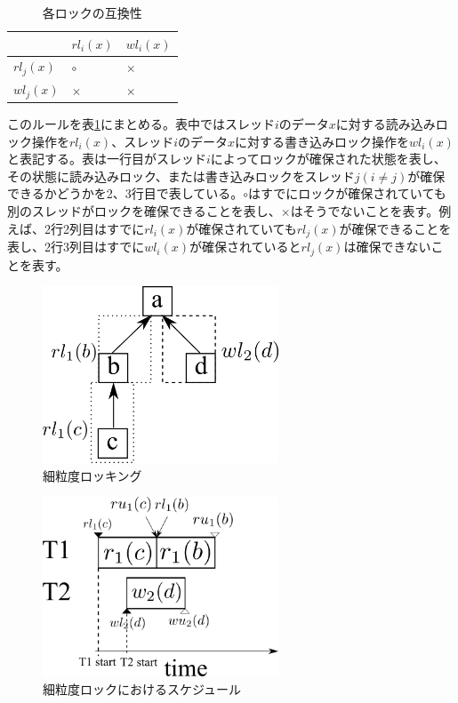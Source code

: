 \documentclass[a4paper]{jreport}	%
\begin{document}
\begin{table}[h!]
\centering
\begin{tabular}{ | m{1cm} | m{1cm} | m{1cm} | } 
  \hline
  & $rl_i(x)$ & $wl_i(x)$ \\ 
  \hline
  $rl_j(x)$ & $\circ$ & $\times$ \\ 
  \hline
  $wl_j(x)$ &  $\times$ & $\times$ \\ 
  \hline
\end{tabular}	
\caption{各ロックの互換性}
\label{table:lock-table}
\end{table}

このルールを表\ref{table:lock-table}にまとめる。表中ではスレッド$i$のデータ$x$に対する読み込みロック操作を$rl_i(x)$、スレッド$i$のデータ$x$に対する書き込みロック操作を$wl_i(x)$と表記する。表は一行目がスレッド$i$によってロックが確保された状態を表し、その状態に読み込みロック、または書き込みロックをスレッド$j(i \neq j)$が確保できるかどうかを2、3行目で表している。$\circ$はすでにロックが確保されていても別のスレッドがロックを確保できることを表し、$\times$はそうでないことを表す。例えば、2行2列目はすでに$rl_i(x)$が確保されていても$rl_j(x)$が確保できることを表し、2行3列目はすでに$wl_i(x)$が確保されていると$rl_j(x)$は確保できないことを表す。

\begin{figure}[h] 
\centering
\includegraphics[width=7cm]{high-gran-lock}
\caption{細粒度ロッキング}
\label{fig:high-gran-lock}
\end{figure}


\begin{figure}[h] 
\centering
\includegraphics[width=7cm]{high-gran-time}
\caption{細粒度ロックにおけるスケジュール}
\label{fig:high-gran-time}
\end{figure}
\end{document}
